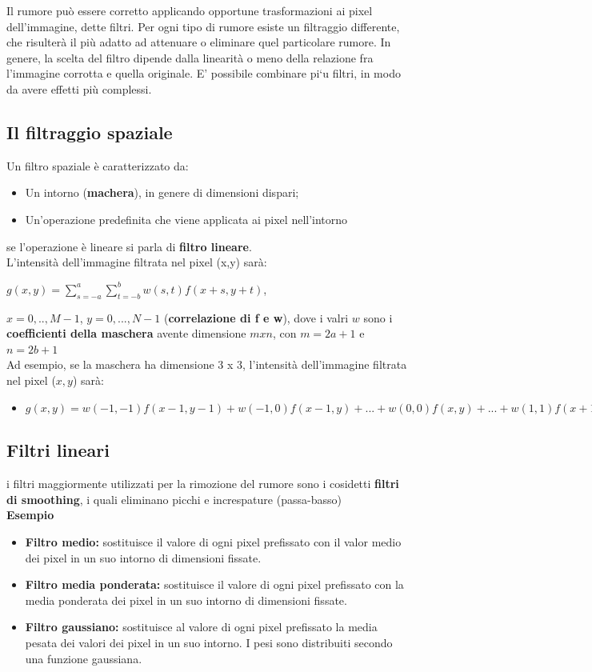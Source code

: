Il rumore può essere corretto applicando opportune trasformazioni ai pixel dell’immagine, dette filtri.
Per ogni tipo di rumore esiste un filtraggio differente, che risulterà il più adatto ad attenuare o eliminare quel particolare rumore.
In genere, la scelta del filtro dipende dalla linearità o meno della relazione fra l’immagine corrotta e quella originale.
E’ possibile combinare pi`u filtri, in modo da avere effetti più complessi.

\subsection{Il filtraggio spaziale}

Un filtro spaziale è caratterizzato da:

\begin{itemize}
    \item Un intorno (\textbf{machera}), in genere di dimensioni dispari;
    \item Un'operazione predefinita che viene applicata ai pixel nell'intorno
\end{itemize}
se l'operazione è lineare si parla di \textbf{filtro lineare}.
\\
L'intensità dell'immagine filtrata nel pixel (x,y) sarà:
\begin{center}
    $g(x,y) = \sum_{s=-a}^{a}\sum_{t=-b}^{b}w(s,t)f(x+s,y+t)$,
\end{center}
$x=0,..,M-1$, $y=0,...,N-1$ (\textbf{correlazione di f e w}), dove i valri $w$ sono i \textbf{coefficienti della maschera}
avente dimensione $m x n$, con $m = 2a+1$ e $n = 2b+1$
\\
Ad esempio, se la maschera ha dimensione 3 x 3, l'intensità dell'immagine filtrata nel pixel ($x,y$) sarà:
\begin{itemize}
    \item $g(x,y)=w(-1,-1)f(x-1,y-1)+w(-1,0)f(x-1,y)+...+w(0,0)f(x,y)+...+w(1,1)f(x+1,y+1)$
\end{itemize}

\subsection{Filtri lineari}

i filtri maggiormente utilizzati per la rimozione del rumore sono i cosidetti \textbf{filtri di smoothing}, i quali eliminano picchi e increspature (passa-basso)
\\
\textbf{Esempio}

\begin{itemize}
    \item \textbf{Filtro medio:} sostituisce il valore di ogni pixel prefissato con il
          valor medio dei pixel in un suo intorno di dimensioni fissate.
    \item \textbf{Filtro media ponderata:} sostituisce il valore di ogni pixel prefissato con la media ponderata dei pixel in un suo
          intorno di dimensioni fissate.
    \item \textbf{Filtro gaussiano:} sostituisce al valore di ogni pixel prefissato la
          media pesata dei valori dei pixel in un suo intorno. I pesi sono distribuiti secondo una funzione gaussiana.
\end{itemize}


